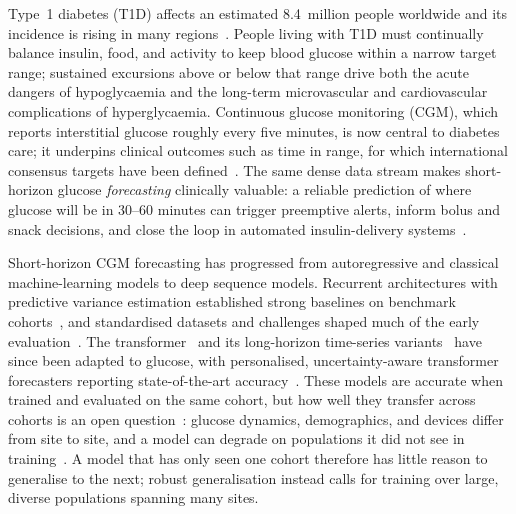 \documentclass[10pt,letterpaper]{article}
\begin{document}
Type~1 diabetes (T1D) affects an estimated 8.4~million people worldwide and its
incidence is rising in many regions~\cite{idf2021,gregory2022t1dindex}. People living with T1D must
continually balance insulin, food, and activity to keep blood glucose within a
narrow target range; sustained excursions above or below that range drive both
the acute dangers of hypoglycaemia and the long-term microvascular and
cardiovascular complications of hyperglycaemia. Continuous glucose monitoring
(CGM), which reports interstitial glucose roughly every five minutes, is now
central to diabetes care; it underpins clinical outcomes such as time in range,
for which international consensus targets have been defined~\cite{battelino2019tir}. The same dense data stream makes
short-horizon glucose \emph{forecasting} clinically valuable: a reliable
prediction of where glucose will be in 30--60 minutes can trigger preemptive
alerts, inform bolus and snack decisions, and close the loop in automated
insulin-delivery systems~\cite{vettoretti2020advanced,bekiari2018ap}.

Short-horizon CGM forecasting has progressed from autoregressive and classical
machine-learning models to deep sequence models. Recurrent architectures with
predictive variance estimation established strong baselines on benchmark
cohorts~\cite{martinsson2020}, and standardised datasets and challenges shaped
much of the early evaluation~\cite{marling2020ohio}. The
transformer~\cite{vaswani2017attention} and its long-horizon time-series
variants~\cite{zhou2021informer,wu2021autoformer} have since been adapted to
glucose, with personalised, uncertainty-aware transformer forecasters reporting
state-of-the-art accuracy~\cite{sergazinov2023gluformer,sergazinov2024glucobench}.
These models are accurate when trained and evaluated on the same cohort, but how
well they transfer across cohorts is an open question~\cite{ghimire2024generalize}:
glucose dynamics, demographics, and devices differ from site to site, and a model
can degrade on populations it did not see in training~\cite{farahmand2025glumind}.
A model that has only seen one cohort therefore has little reason to generalise to
the next; robust generalisation instead calls for training over large, diverse
populations spanning many sites.
\end{document}
